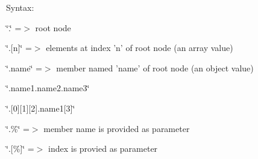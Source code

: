 Syntax\-:
\begin{DoxyItemize}
\item \char`\"{}.\char`\"{} =$>$ root node
\item \char`\"{}.\mbox{[}n\mbox{]}\char`\"{} =$>$ elements at index 'n' of root node (an array value)
\item \char`\"{}.\-name\char`\"{} =$>$ member named 'name' of root node (an object value)
\item \char`\"{}.\-name1.\-name2.\-name3\char`\"{}
\item \char`\"{}.\mbox{[}0\mbox{]}\mbox{[}1\mbox{]}\mbox{[}2\mbox{]}.\-name1\mbox{[}3\mbox{]}\char`\"{}
\item \char`\"{}.\%\char`\"{} =$>$ member name is provided as parameter
\item \char`\"{}.\mbox{[}\%\mbox{]}\char`\"{} =$>$ index is provied as parameter 
\end{DoxyItemize}

